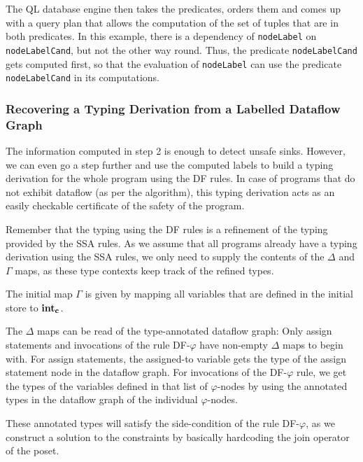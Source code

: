 The QL database engine then takes the predicates, orders them and comes up with 
a query plan that allows the computation of the set of tuples that are in both predicates.
In this example, there is a dependency of \texttt{nodeLabel} on \texttt{nodeLabelCand},
but not the other way round.
Thus, the predicate \texttt{nodeLabelCand} gets computed first, so that the evaluation
of \texttt{nodeLabel} can use the predicate \texttt{nodeLabelCand} in its computations.


\subsubsection*{Recovering a Typing Derivation from a Labelled Dataflow Graph}
The information computed in step 2 is enough to detect unsafe sinks.
However, we can even go a step further and use the computed labels to build a
typing derivation for the whole program using the DF rules.
In case of programs that do not exhibit dataflow (as per the algorithm), this
typing derivation acts as an easily checkable certificate of the safety of the program.

Remember that the typing using the DF rules is a refinement of the typing provided 
by the SSA rules.
As we assume that all programs already have a typing derivation using the SSA rules,
we only need to supply the contents of the $\Delta$ and $\Gamma$ maps, as these 
type contexts keep track of the refined types.

The initial map $\Gamma$ is given by mapping all variables that are defined in 
the initial store to $\textbf{int}_\textbf{c}$.

The $\Delta$ maps can be read of the type-annotated dataflow graph:
Only assign statements and invocations of the rule \textsc{DF-$\varphi$}
have non-empty $\Delta$ maps to begin with.
For assign statements, the assigned-to variable gets the type of the assign statement 
node in the dataflow graph.
For invocations of the \textsc{DF-$\varphi$} rule, we get the types of the 
variables defined in that list of $\varphi$-nodes by using the annotated
types in the dataflow graph of the individual $\varphi$-nodes.

These annotated types will satisfy the side-condition of the rule \textsc{DF-$\varphi$},
as we construct a solution to the constraints by basically hardcoding the join operator
of the poset.

